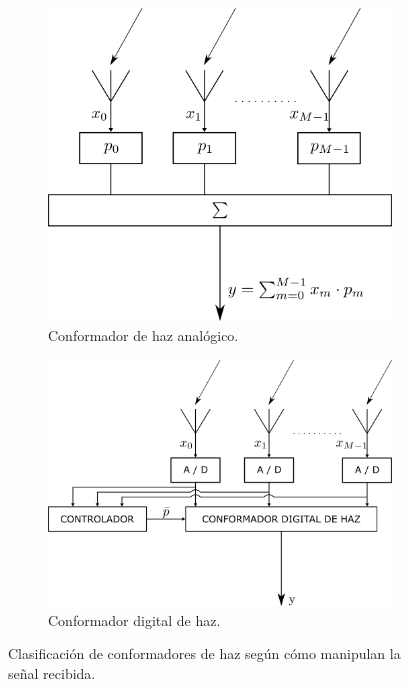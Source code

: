 \begin{figure}[ht!]
    \centering
    \begin{subfigure}[b]{0.7\textwidth}
        \centering
        \includegraphics[width=\linewidth]{images/02-Beamforming/analogbeamformer.png}
        \caption{Conformador de haz analógico.}
        \label{fig:beamforming_analogbeamformer}
    \end{subfigure}
    \hfill
    \begin{subfigure}[b]{0.8\textwidth}
        \centering
        \includegraphics[width=\linewidth]{images/02-Beamforming/digitalbeamformer.png}
        \caption{Conformador digital de haz.}
        \label{fig:beamforming_digitalbeamformer}
    \end{subfigure}
    \caption{Clasificación de conformadores de haz según cómo manipulan la señal recibida.}
\end{figure}

